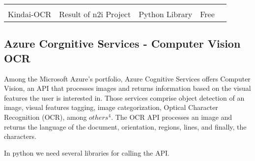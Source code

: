\documentclass[
]{article}
\newenvironment{Shaded}{\begin{snugshade}}{\end{snugshade}}
\newcommand{\CommentTok}[1]{\textcolor[rgb]{0.56,0.35,0.01}{\textit{#1}}}
\newcommand{\ImportTok}[1]{#1}
\newcommand{\NormalTok}[1]{#1}
\begin{document}
\begin{longtable}[]{@{}lllll@{}}
\begin{minipage}[t]{0.18\columnwidth}
\end{minipage}\tabularnewline
\begin{minipage}[t]{0.37\columnwidth}\raggedright
Kindai-OCR\strut
\end{minipage} & \begin{minipage}[t]{0.09\columnwidth}\raggedright
Result of n2i Project\strut
\end{minipage} & \begin{minipage}[t]{0.14\columnwidth}\raggedright
Python Library\strut
\end{minipage} & \begin{minipage}[t]{0.07\columnwidth}\raggedright
Free\strut
\end{minipage} & \begin{minipage}[t]{0.18\columnwidth}\raggedright
\strut
\end{minipage}\tabularnewline
\bottomrule
\end{longtable}

\hypertarget{azure-corgnitive-services---computer-vision-ocr}{%
\subsection{Azure Corgnitive Services - Computer Vision
OCR}\label{azure-corgnitive-services---computer-vision-ocr}}

Among the Microsoft Azure's portfolio, Azure Cognitive Services offers
Computer Vision, an API that processes images and returns information
based on the visual features the user is interested in. Those services
comprise object detection of an image, visual features tagging, image
categorization, Optical Character Recognition (OCR), among \(others^4\).
The OCR API processes an image and returns the language of the document,
orientation, regions, lines, and finally, the characters.

In python we need several libraries for calling the API.

\begin{Shaded}
\end{Shaded}
\end{document}
